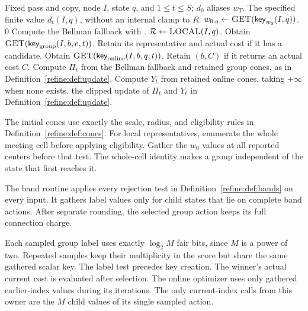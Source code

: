 \documentclass[11pt]{article}
\newcommand{\wedkey}[2]{\mathsf{key}_{#1}(#2)}
\newenvironment{wedalgorithm}[2]{%
  \begin{algorithm}[!htbp]%
  \caption{#1}\label{#2}%
  \small\begin{algorithmic}[1]%
}{%
  \end{algorithmic}\end{algorithm}%
}
\theoremstyle{definition}
\newcommand{\1}{\mathbf 1}
\begin{document}
\begin{wedalgorithm}{The clipped refinement update}{alg:refine}
\Require Fixed pass and copy, node $I$, state $q$, and $1\le t\le S$; $d_0$ aliases $w_T$.
\Ensure The specified finite value $d_t(I,q)$, without an internal clamp to $R$.
   \State \Return {} \EndIf
  \State $w_{0,q}\gets\Call{GET}{\wedkey{w_0}{I,q}}$.
   \State \Return $0$ \EndIf
  \State Compute the Bellman fallback with .
  \State $\mathcal R\gets\Call{LOCAL}{I,q}$.
    \State Obtain $\Call{GET}{\wedkey{\mathrm{group}}{I,b,e,t}}$.
    \State Retain its representative and actual cost if it has a candidate.
  \EndFor
    \State Obtain $\Call{GET}{\wedkey{\mathrm{online}}{I,b,q,t}}$.
  \State Retain $(b,C)$ if it returns an actual cost $C$.
  \EndFor
  \State Compute $\Pi_t$ from the Bellman fallback and retained group cones, as in Definition~\ref{refine:def:update}.
  \State Compute $Y_t$ from retained online cones, taking $+\infty$ when none exists.
  \State \Return the clipped update of $\Pi_t$ and $Y_t$ in Definition~\ref{refine:def:update}.
\EndProcedure
\end{wedalgorithm}
\FloatBarrier



The initial cones use exactly the scale, radius, and eligibility rules in
Definition~\ref{refine:def:cones}. For local representatives, enumerate
the whole meeting cell before applying eligibility. Gather the $w_0$
values at all reported centers before that test. The whole-cell identity
makes a group independent of the state that first reaches it.

The band routine applies every rejection test in
Definition~\ref{refine:def:bands} on every input. It gathers label values
only for child states that lie on complete band actions. After separate
rounding, the selected group action keeps its full connection charge.

Each sampled group label uses exactly $\log_2M$ fair bits, since $M$
is a power of two. Repeated samples keep their multiplicity in the score
but share the same gathered scalar key. The label test precedes key
creation. The winner's actual current cost is evaluated after selection.
The online optimizer uses only gathered earlier-index values during its
iterations. The only current-index calls from this owner are the $M$
child values of its single sampled action.
\end{document}
